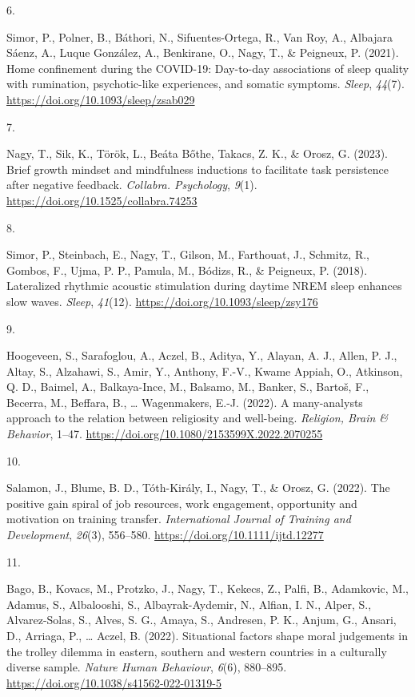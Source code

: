 \documentclass[10pt,a4paper,]{twentysecondcv}
\newlength{\csllabelwidth}
\newcommand{\CSLLeftMargin}[1]{\parbox[t]{\csllabelwidth}{#1}}
\newcommand{\CSLRightInline}[1]{\parbox[t]{\linewidth - \csllabelwidth}{#1}}
\begin{document}
\leavevmode{}%
\CSLLeftMargin{6. }%
\CSLRightInline{Simor, P., Polner, B., Báthori, N., Sifuentes-Ortega,
R., Van Roy, A., Albajara Sáenz, A., Luque González, A., Benkirane, O.,
Nagy, T., \& Peigneux, P. (2021). Home confinement during the COVID-19:
Day-to-day associations of sleep quality with rumination, psychotic-like
experiences, and somatic symptoms. \emph{Sleep}, \emph{44}(7).
\url{https://doi.org/10.1093/sleep/zsab029}}

\leavevmode{}%
\CSLLeftMargin{7. }%
\CSLRightInline{Nagy, T., Sik, K., Török, L., Beáta Bőthe, Takacs, Z.
K., \& Orosz, G. (2023). Brief growth mindset and mindfulness inductions
to facilitate task persistence after negative feedback. \emph{Collabra.
Psychology}, \emph{9}(1). \url{https://doi.org/10.1525/collabra.74253}}

\leavevmode{}%
\CSLLeftMargin{8. }%
\CSLRightInline{Simor, P., Steinbach, E., Nagy, T., Gilson, M.,
Farthouat, J., Schmitz, R., Gombos, F., Ujma, P. P., Pamula, M., Bódizs,
R., \& Peigneux, P. (2018). Lateralized rhythmic acoustic stimulation
during daytime NREM sleep enhances slow waves. \emph{Sleep},
\emph{41}(12). \url{https://doi.org/10.1093/sleep/zsy176}}

\leavevmode{}%
\CSLLeftMargin{9. }%
\CSLRightInline{Hoogeveen, S., Sarafoglou, A., Aczel, B., Aditya, Y.,
Alayan, A. J., Allen, P. J., Altay, S., Alzahawi, S., Amir, Y., Anthony,
F.-V., Kwame Appiah, O., Atkinson, Q. D., Baimel, A., Balkaya-Ince, M.,
Balsamo, M., Banker, S., Bartoš, F., Becerra, M., Beffara, B., \ldots{}
Wagenmakers, E.-J. (2022). A many-analysts approach to the relation
between religiosity and well-being. \emph{Religion, Brain \& Behavior},
1--47. \url{https://doi.org/10.1080/2153599X.2022.2070255}}

\leavevmode{}%
\CSLLeftMargin{10. }%
\CSLRightInline{Salamon, J., Blume, B. D., Tóth-Király, I., Nagy, T., \&
Orosz, G. (2022). The positive gain spiral of job resources, work
engagement, opportunity and motivation on training transfer.
\emph{International Journal of Training and Development}, \emph{26}(3),
556--580. \url{https://doi.org/10.1111/ijtd.12277}}

\leavevmode{}%
\CSLLeftMargin{11. }%
\CSLRightInline{Bago, B., Kovacs, M., Protzko, J., Nagy, T., Kekecs, Z.,
Palfi, B., Adamkovic, M., Adamus, S., Albalooshi, S., Albayrak-Aydemir,
N., Alfian, I. N., Alper, S., Alvarez-Solas, S., Alves, S. G., Amaya,
S., Andresen, P. K., Anjum, G., Ansari, D., Arriaga, P., \ldots{} Aczel,
B. (2022). Situational factors shape moral judgements in the trolley
dilemma in eastern, southern and western countries in a culturally
diverse sample. \emph{Nature Human Behaviour}, \emph{6}(6), 880--895.
\url{https://doi.org/10.1038/s41562-022-01319-5}}
\end{document}
